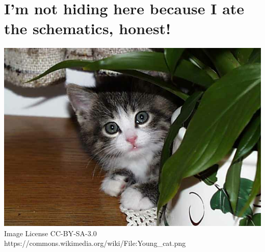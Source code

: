 \documentclass{article}
\begin{document}
\section*{I'm not hiding here because I ate the schematics, honest!}

\includegraphics{kitty.png}
{Image License CC-BY-SA-3.0 https://commons.wikimedia.org/wiki/File:Young\_cat.png}
\end{document}

